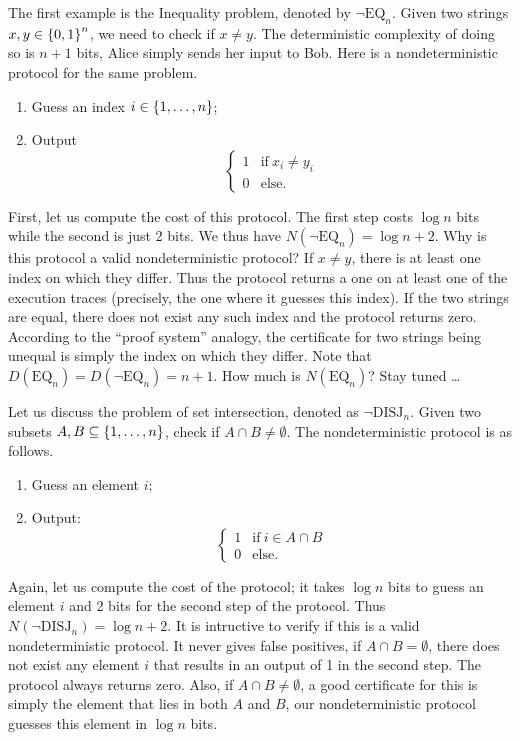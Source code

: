 \documentclass[usletter]{article}
\providecommand\cbrac[1]{\ensuremath \left\{#1\right\}}
\newcommand{\nDISJ}{\neg \mathrm{DISJ}}
\newcommand{\EQ}{\mathrm{EQ}}
\newcommand{\nEQ}{\neg \mathrm{EQ}}
\begin{document}
\begin{example}
The first example is the Inequality problem, denoted by $\nEQ_n$. Given two strings $x, y \in \cbrac{0,1}^n$, we need to check if $x \neq y$. The deterministic complexity of doing so is $n+1$ bits, Alice simply sends her input to Bob. Here is a nondeterministic protocol for the same problem.
\begin{enumerate}
    \item Guess an index $i \in \cbrac{1, \ldots, n}$;
    \item Output
         $$
            \begin{cases}
            1 & \mathrm{if}\ x_i \neq y_i\\
            0 & \mathrm{else.}
            \end{cases}
         $$
\end{enumerate}
First, let us compute the cost of this protocol. The first step costs $\log n$ bits while the second is just 2 bits. We thus have $N(\nEQ_n) = \log n + 2$. Why is this protocol a valid nondeterministic protocol? If $x \neq y$, there is at least one index on which they differ. Thus the protocol returns a one on at least one of the execution traces (precisely, the one where it guesses this index). If the two strings are equal, there does not exist any such index and the protocol returns zero. According to the ``proof system'' analogy, the certificate for two strings being unequal is simply the index on which they differ. Note that $D(\EQ_n) = D(\nEQ_n) = n+1$. How much is $N(\EQ_n)$? Stay tuned \ldots
\end{example}

\begin{example}
Let us discuss the problem of set intersection, denoted as $\nDISJ_n$. Given two subsets $A, B \subseteq \cbrac{1, \ldots, n}$, check if $A \cap B \neq \emptyset$. The nondeterministic protocol is as follows.
\begin{enumerate}
    \item Guess an element $i$;
    \item Output:
         $$
            \begin{cases}
            1 & \mathrm{if}\ i \in A \cap B\\
            0 & \mathrm{else.}
            \end{cases}
         $$
\end{enumerate}
Again, let us compute the cost of the protocol; it takes $\log n$ bits to guess an element $i$ and 2 bits for the second step of the protocol. Thus $N(\nDISJ_n) = \log n + 2$. It is intructive to verify if this is a valid nondeterministic protocol. It never gives false positives, if $A \cap B = \emptyset$, there does not exist any element $i$ that results in an output of 1 in the second step. The protocol always returns zero. Also, if $A \cap B \neq \emptyset$, a good certificate for this is simply the element that lies in both $A$ and $B$, our nondeterministic protocol guesses this element in $\log n$ bits.
\end{example}
\end{document}
